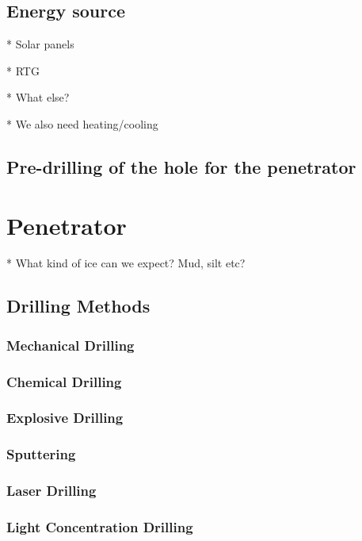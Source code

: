 \documentclass{book}
\begin{document}
\subsection{Energy source}

* Solar panels

* RTG

* What else?

* We also need heating/cooling

\subsection{Pre-drilling of the hole for the penetrator}


\section{Penetrator}

* What kind of ice can we expect? Mud, silt etc?

\subsection{Drilling Methods}

\subsubsection{Mechanical Drilling}

\subsubsection{Chemical Drilling}

\subsubsection{Explosive Drilling}

\subsubsection{Sputtering}

\subsubsection{Laser Drilling}

\subsubsection{Light Concentration Drilling}
\end{document}
